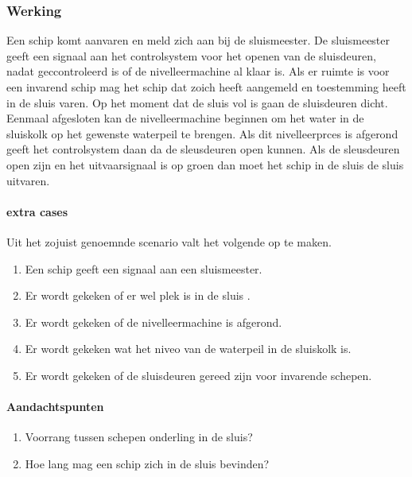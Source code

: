 \subsubsection{Werking}

Een schip komt aanvaren en meld zich aan bij de sluismeester. De sluismeester geeft een signaal aan het controlsystem voor het openen van de sluisdeuren, nadat geccontroleerd is of de nivelleermachine al klaar is. Als er ruimte is voor een invarend schip mag het schip dat zoich heeft aangemeld en toestemming heeft  in de sluis varen. Op het moment dat de sluis vol is gaan de sluisdeuren dicht. Eenmaal afgesloten kan de nivelleermachine beginnen om het water in de sluiskolk op het gewenste waterpeil te brengen. Als dit nivelleerprces is afgerond geeft  het controlsystem daan da de sleusdeuren open kunnen.  Als de sleusdeuren open zijn en het uitvaarsignaal is op groen dan moet het schip in de sluis de sluis uitvaren.
\paragraph{extra cases}
Uit het zojuist genoemnde scenario valt het volgende op te maken.
\begin{enumerate}
	\item Een schip geeft een signaal aan een sluismeester.
	\item Er wordt gekeken of er wel plek is in de sluis .
	\item Er wordt gekeken of de nivelleermachine is afgerond.
	\item Er wordt gekeken wat het niveo van de waterpeil in de sluiskolk is.
	\item Er wordt gekeken of de sluisdeuren gereed zijn voor invarende schepen.
\end{enumerate}
\paragraph{Aandachtspunten}
\begin{enumerate}
	\item Voorrang tussen schepen onderling in de sluis?
	\item Hoe lang mag een schip zich in de sluis bevinden?
\end{enumerate} 




